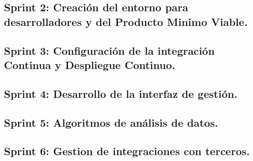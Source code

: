 \subsection{Sprint 2: Creación del entorno para desarrolladores y del Producto
  Minimo Viable.}
\subsection{Sprint 3: Configuración de la integración Continua y Despliegue
  Continuo.}
\subsection{Sprint 4: Desarrollo de la interfaz de gestión.}
\subsection{Sprint 5: Algoritmos de análisis de datos.}
\subsection{Sprint 6: Gestion de integraciones con terceros.}